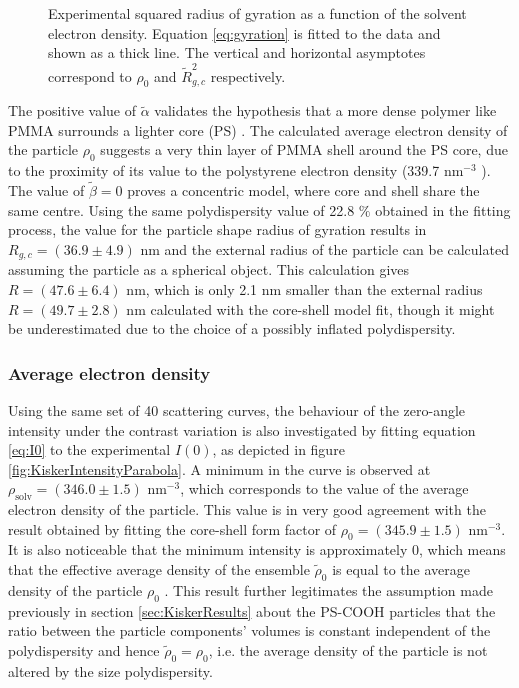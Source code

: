 \begin{figure}%
	\centering
		
		\caption[Radius of gyration of the PS-COOH particles.]{Experimental squared radius of gyration as a function of the solvent electron density. Equation \ref{eq:gyration} is fitted to the data and shown as a thick line. The vertical and horizontal asymptotes correspond to $\rho_0$ and $\tilde R^2_{g,c}$ respectively.}
		\label{fig:KiskerGuinierRadius}
\end{figure}

The positive value of \(\tilde\alpha\) validates the hypothesis that a more dense polymer like PMMA surrounds a lighter core (PS) \citep{stuhrmann_small-angle_2008}. The calculated average electron density of the particle \(\rho_0\) suggests a very thin layer of PMMA shell around the PS core, due to the proximity of its value to the polystyrene electron density (339.7 nm\(^{-3}\) ). The value of \( \tilde\beta=0\) proves a concentric model, where core and shell share the same centre. Using the same polydispersity value of 22.8 $\%$ obtained in the fitting process, the value for the particle shape radius of gyration results in \(R_{g,c}=\left(36.9\pm4.9\right)\) nm and the external radius of the particle can be calculated assuming the particle as a spherical object. This calculation gives \( R=\left(47.6\pm6.4\right)\) nm, which is only 2.1 nm smaller than the external radius \(R=\left(49.7\pm2.8\right)\) nm calculated with the core-shell model fit, though it might be underestimated due to the choice of a possibly inflated polydispersity. 

\subsubsection{Average electron density}
Using the same set of 40 scattering curves, the behaviour of the zero-angle intensity under the contrast variation is also investigated by fitting equation \ref{eq:I0} to the experimental \(I(0)\), as depicted in figure \ref{fig:KiskerIntensityParabola}. A minimum in the curve is observed at \(\rho_{\text{solv}}=\left( 346.0 \pm 1.5 \right)\) nm\(^{-3}\), which corresponds to the value of the average electron density of the particle. This value is in very good agreement with the result obtained by fitting the core-shell form factor of \(\rho_0=\left( 345.9 \pm 1.5 \right)\) nm\(^{-3}\). It is also noticeable that the minimum intensity is approximately 0, which means that the effective average density of the ensemble $\tilde \rho_0$ is equal to the average density of the particle $\rho_0$ \citep{avdeev_contrast_2007}. This result further legitimates the assumption made previously in section \ref{sec:KiskerResults} about the PS-COOH particles that the ratio between the particle components' volumes is constant independent of the polydispersity and hence \(  \tilde \rho_0 = \rho_0  \), i.e. the average density of the particle is not altered by the size polydispersity.

